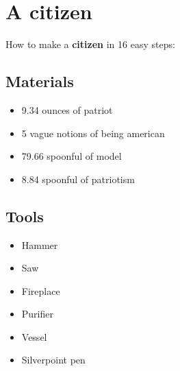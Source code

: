 \documentclass{article}
\begin{document}
\section{A citizen}How to make a \textbf{citizen} in 16 easy steps:

\subsection{Materials}\begin{itemize}
\item 
9.34 ounces of patriot
\item 
5 vague notions of being american
\item 
79.66 spoonful of model
\item 
8.84 spoonful of patriotism
\end{itemize}
\subsection{Tools}\begin{itemize}
\item 
Hammer
\item 
Saw
\item 
Fireplace
\item 
Purifier
\item 
Vessel
\item 
Silverpoint pen
\end{itemize}
\end{document}
